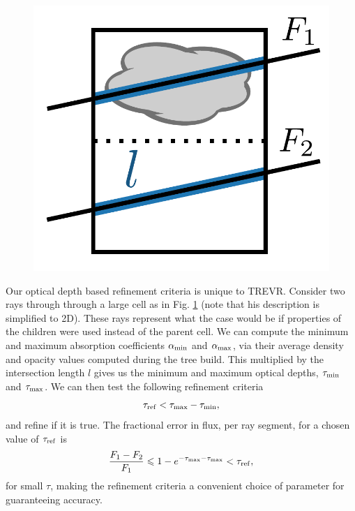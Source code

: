 \documentclass[fleq,usenatbib]{mnras}
\newcommand{\acro}{TREVR}
\newcommand{\tr}{\tau_{\rm ref}}
\begin{document}
\begin{figure}
\includegraphics[width=1\linewidth]{Figures/refine.pdf}
\caption{}
\label{fig:refine}
\end{figure}
Our optical depth based refinement criteria is unique to \acro. Consider two 
rays through through a large cell as in Fig. \ref{fig:refine} (note that his 
description is simplified to 2D). These rays represent what the case would be 
if properties of the children were used instead of the parent cell. We can 
compute the minimum and maximum absorption coefficients $\alpha_{\rm min}$ and 
$\alpha_{\rm max}$, via their average density and opacity values computed 
during the tree build. This multiplied by the intersection length $l$ gives us 
the minimum and maximum optical depths, $\tau_{\rm min}$ and $\tau_{\rm max}$. 
We can then test the following refinement criteria
\begin{equation}
\label{eqn:refcrit}
\tr < \tau_{\rm max} - \tau_{\rm min},
\end{equation}
and refine if it is true. The fractional error in flux, per ray segment, for a 
chosen value of $\tr$ is
\begin{equation}
\label{eqn:reffrac}
\frac{F_1 - F_2}{F_1} \leq 1 - e^{-\tau_{\rm max}-\tau_{\rm max}} 
< \tr,
\end{equation}
for small $\tau$, making the refinement criteria a convenient choice of 
parameter for guaranteeing accuracy.
\end{document}
